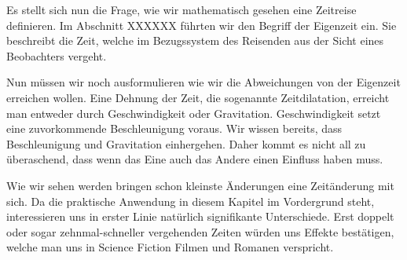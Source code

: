 \begin{refsection}
Es stellt sich nun die Frage, wie wir mathematisch gesehen eine Zeitreise definieren. Im Abschnitt XXXXXX führten wir den Begriff der Eigenzeit ein. Sie beschreibt die Zeit, welche im Bezugssystem des Reisenden aus der Sicht eines Beobachters vergeht.

Nun müssen wir noch ausformulieren wie wir die Abweichungen von der Eigenzeit erreichen wollen. Eine Dehnung der Zeit, die sogenannte Zeitdilatation, erreicht man entweder durch Geschwindigkeit oder Gravitation. Geschwindigkeit setzt eine zuvorkommende Beschleunigung voraus. Wir wissen bereits, dass Beschleunigung und Gravitation einhergehen. Daher kommt es nicht all zu \"uberaschend, dass wenn das Eine auch das Andere einen Einfluss haben muss.

Wie wir sehen werden bringen schon kleinste \"Anderungen eine Zeitänderung mit sich. Da die praktische Anwendung in diesem Kapitel im Vordergrund steht, interessieren uns in erster Linie natürlich signifikante Unterschiede. Erst doppelt oder sogar zehnmal-schneller vergehenden Zeiten w\"urden uns Effekte best\"atigen, welche man uns in Science Fiction Filmen und Romanen verspricht.


\end{refsection}
